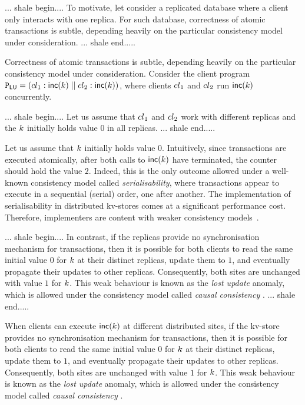 ... shale begin....
To motivate, let consider a replicated database where
a client only interacts with one replica.
For such database,
correctness of atomic transactions is subtle, depending heavily on the
particular consistency model under consideration.  
... shale end.....

Correctness of atomic transactions is subtle, depending heavily on the
particular consistency model under consideration.  
Consider the client program
$\mathtt{P}_{\mathsf{LU}} = \left({cl}_1 : \mathsf{inc}(k) \;|| \; {cl}_2:
  \mathsf{inc}(k) \right)$, where clients ${cl}_1$ and ${cl}_2$ run
$\mathsf{inc}(k)$ concurrently.

... shale begin....
Let us assume that \( {cl}_1 \) and \( {cl}_2 \) work with different replicas and
the $k$ initially holds value $0$ in all replicas.
... shale end.....

Let us assume that  $k$ initially holds value $0$.
Intuitively, since transactions are executed atomically, after both
calls to $\mathsf{inc}(k)$ have terminated, the counter should hold 
the value $2$.
Indeed, this is the only outcome allowed under 
a well-known
consistency model called  \emph{serialisability}, where transactions
appear to execute in a sequential (serial) order, one after another.
The implementation of  serialisability in distributed kv-stores comes at a
significant performance cost. Therefore, implementers are content with
{weaker} consistency models~\cite{ramp,rola,cops,wren,redblue,PSI,NMSI,gdur,clocksi,distrsi}. 


... shale begin....
In contrast, if the replicas provide no synchronisation mechanism for transactions,
then it is possible for both clients to read the same initial value $0$ for $k$ at their
distinct replicas, update them to $1$, and eventually propagate their updates to other replicas. 
Consequently, both
sites  are unchanged with value  $1$ for $k$.
This weak behaviour is known as the \emph{lost update} anomaly, which
is  allowed under the consistency model called {\em causal consistency} \cite{cops,wren,redblue}.
... shale end.....

When clients can execute $\mathsf{inc}(k)$ at different distributed
sites,
if the kv-store provides no synchronisation mechanism for transactions,
then it is possible for both clients to read the same initial value $0$ for $k$ at their
distinct replicas, update them to $1$, and eventually propagate their updates to other replicas.
Consequently, both
sites  are unchanged with value  $1$ for $k$.
This weak behaviour is known as the \emph{lost update} anomaly, which
is  allowed under the consistency model called {\em causal consistency} \cite{cops,wren,redblue}.


